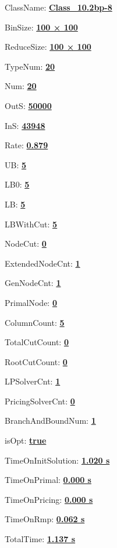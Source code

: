 \documentclass[11pt]{article}
\begin{document}
\pagestyle{empty}


ClassName: \underline{\textbf{Class_10.2bp-8}}
\par
BinSize: \underline{\textbf{100 × 100}}
\par
ReduceSize: \underline{\textbf{100 × 100}}
\par
TypeNum: \underline{\textbf{20}}
\par
Num: \underline{\textbf{20}}
\par
OutS: \underline{\textbf{50000}}
\par
InS: \underline{\textbf{43948}}
\par
Rate: \underline{\textbf{0.879}}
\par
UB: \underline{\textbf{5}}
\par
LB0: \underline{\textbf{5}}
\par
LB: \underline{\textbf{5}}
\par
LBWithCut: \underline{\textbf{5}}
\par
NodeCut: \underline{\textbf{0}}
\par
ExtendedNodeCnt: \underline{\textbf{1}}
\par
GenNodeCnt: \underline{\textbf{1}}
\par
PrimalNode: \underline{\textbf{0}}
\par
ColumnCount: \underline{\textbf{5}}
\par
TotalCutCount: \underline{\textbf{0}}
\par
RootCutCount: \underline{\textbf{0}}
\par
LPSolverCnt: \underline{\textbf{1}}
\par
PricingSolverCnt: \underline{\textbf{0}}
\par
BranchAndBoundNum: \underline{\textbf{1}}
\par
isOpt: \underline{\textbf{true}}
\par
TimeOnInitSolution: \underline{\textbf{1.020 s}}
\par
TimeOnPrimal: \underline{\textbf{0.000 s}}
\par
TimeOnPricing: \underline{\textbf{0.000 s}}
\par
TimeOnRmp: \underline{\textbf{0.062 s}}
\par
TotalTime: \underline{\textbf{1.137 s}}
\par
\newpage


\end{document}
